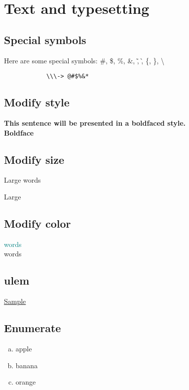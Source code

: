 \documentclass{article}[12pt]
\begin{document}
\section{Text and typesetting}
	\subsection{Special symbols}
		\noindent
		Here are some special symbols:
		\#, \$, \%, \&, \~, \`, \{, \}, \textbackslash
		\begin{verbatim} 
			\\\-> @#$%&*   
		\end{verbatim} %
		
	\subsection{Modify style}
		\noindent
		{\bf This sentence will be presented in a boldfaced style.}\\
		\textbf{Boldface}
		
	\subsection{Modify size}
		\noindent
		{\Large Large words} \\
		\begin{Large}
			Large
		\end{Large}
		
	\subsection{Modify color}
		\noindent
		\textcolor{teal}{words}\\
		{\color{teal} words}
		
	\subsection{ulem}
		\noindent
		\uline{Sample}

	\subsection{Enumerate}
		\begin{enumerate}[a.]
			\item apple
			\item banana
			\item orange
		\end{enumerate}
		
\end{document}
